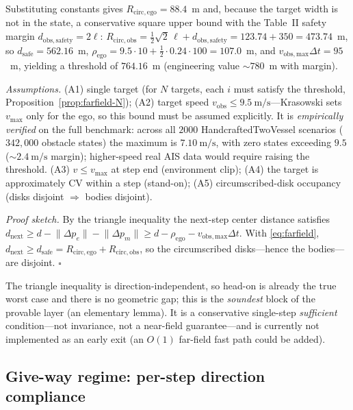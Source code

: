 Substituting constants gives $R_{\mathrm{circ,ego}}=88.4$~m and, because the target
width is not in the state, a conservative square upper bound with the Table~II
safety margin $d_{\mathrm{obs,safety}}=2\ell$:
$R_{\mathrm{circ,obs}}=\tfrac12\sqrt2\,\ell+d_{\mathrm{obs,safety}}
=123.74+350=473.74$~m, so $d_{\mathrm{safe}}=562.16$~m,
$\rho_{\mathrm{ego}}=9.5\cdot10+\tfrac12\cdot0.24\cdot100=107.0$~m, and
$v_{\mathrm{obs,max}}\Delta t=95$~m, yielding a threshold of $764.16$~m
(engineering value $\sim\!780$~m with margin).

\emph{Assumptions.} (A1) single target (for $N$ targets, each $i$ must satisfy the
threshold, Proposition~\ref{prop:farfield-N}); (A2) target speed
$v_{\mathrm{obs}}\le9.5~\mathrm{m/s}$---Krasowski sets $v_{\max}$ only for the ego, so
this bound must be assumed explicitly. It is \emph{empirically verified} on the full
benchmark: across all $2000$ HandcraftedTwoVessel scenarios ($342{,}000$ obstacle
states) the maximum is $7.10~\mathrm{m/s}$, with zero states exceeding $9.5$
($\sim\!2.4~\mathrm{m/s}$ margin); higher-speed real AIS data would require raising
the threshold. (A3) $v\le v_{\max}$ at step end (environment clip); (A4) the target
is approximately CV within a step (stand-on); (A5) circumscribed-disk occupancy
(disks disjoint $\Rightarrow$ bodies disjoint).

\emph{Proof sketch.} By the triangle inequality the next-step center distance
satisfies $d_{\mathrm{next}}\ge d-\lVert\Delta p_e\rVert-\lVert\Delta p_m\rVert
\ge d-\rho_{\mathrm{ego}}-v_{\mathrm{obs,max}}\Delta t$. With \eqref{eq:farfield},
$d_{\mathrm{next}}\ge d_{\mathrm{safe}}=R_{\mathrm{circ,ego}}+R_{\mathrm{circ,obs}}$,
so the circumscribed disks---hence the bodies---are disjoint. $\square$

\begin{scope}
The triangle inequality is direction-independent, so head-on is already the true
worst case and there is no geometric gap; this is the \emph{soundest} block of the
provable layer (an elementary lemma). It is a conservative single-step
\emph{sufficient} condition---not invariance, not a near-field guarantee---and is
currently not implemented as an early exit (an $O(1)$ far-field fast path could be
added).
\end{scope}

\subsection{Give-way regime: per-step direction compliance}
\label{sec:provable-compliance}

